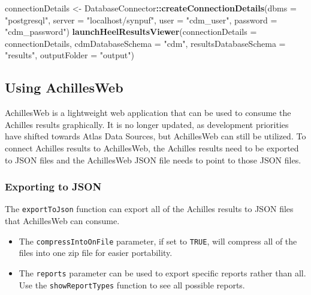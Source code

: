 \documentclass[]{article}
\newenvironment{Shaded}{\begin{snugshade}}{\end{snugshade}}
\newcommand{\KeywordTok}[1]{\textcolor[rgb]{0.13,0.29,0.53}{\textbf{#1}}}
\newcommand{\DataTypeTok}[1]{\textcolor[rgb]{0.13,0.29,0.53}{#1}}
\newcommand{\StringTok}[1]{\textcolor[rgb]{0.31,0.60,0.02}{#1}}
\newcommand{\OperatorTok}[1]{\textcolor[rgb]{0.81,0.36,0.00}{\textbf{#1}}}
\newcommand{\NormalTok}[1]{#1}
\providecommand{\tightlist}{%
  \setlength{\itemsep}{0pt}\setlength{\parskip}{0pt}}
\begin{document}
\begin{Shaded}
\begin{Highlighting}[]
\NormalTok{connectionDetails <-}\StringTok{ }\NormalTok{DatabaseConnector}\OperatorTok{::}\KeywordTok{createConnectionDetails}\NormalTok{(}\DataTypeTok{dbms =} \StringTok{"postgresql"}\NormalTok{, }
                                                                \DataTypeTok{server =} \StringTok{"localhost/synpuf"}\NormalTok{, }
                                                                \DataTypeTok{user =} \StringTok{"cdm_user"}\NormalTok{, }
                                                                \DataTypeTok{password =} \StringTok{"cdm_password"}\NormalTok{)}
\KeywordTok{launchHeelResultsViewer}\NormalTok{(}\DataTypeTok{connectionDetails =}\NormalTok{ connectionDetails, }
                        \DataTypeTok{cdmDatabaseSchema =} \StringTok{"cdm"}\NormalTok{, }
                        \DataTypeTok{resultsDatabaseSchema =} \StringTok{"results"}\NormalTok{, }
                        \DataTypeTok{outputFolder =} \StringTok{"output"}\NormalTok{)}
\end{Highlighting}
\end{Shaded}

\subsection{Using AchillesWeb}\label{using-achillesweb}

AchillesWeb is a lightweight web application that can be used to consume
the Achilles results graphically. It is no longer updated, as
development priorities have shifted towards Atlas Data Sources, but
AchillesWeb can still be utilized. To connect Achilles results to
AchillesWeb, the Achilles results need to be exported to JSON files and
the AchillesWeb JSON file needs to point to those JSON files.

\subsubsection{Exporting to JSON}\label{exporting-to-json}

The \texttt{exportToJson} function can export all of the Achilles
results to JSON files that AchillesWeb can consume.

\begin{itemize}
\tightlist
\item
  The \texttt{compressIntoOnFile} parameter, if set to \texttt{TRUE},
  will compress all of the files into one zip file for easier
  portability.
\item
  The \texttt{reports} parameter can be used to export specific reports
  rather than all. Use the \texttt{showReportTypes} function to see all
  possible reports.
\end{itemize}
\end{document}
